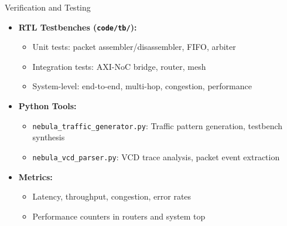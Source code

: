 \documentclass{beamer}
\begin{document}
\begin{frame}{Verification and Testing}
  \begin{itemize}
    \item \textbf{RTL Testbenches (\texttt{code/tb/}):}
      \begin{itemize}
        \item Unit tests: packet assembler/disassembler, FIFO, arbiter
        \item Integration tests: AXI-NoC bridge, router, mesh
        \item System-level: end-to-end, multi-hop, congestion, performance
      \end{itemize}
    \item \textbf{Python Tools:}
      \begin{itemize}
        \item \texttt{nebula\_traffic\_generator.py}: Traffic pattern generation, testbench synthesis
        \item \texttt{nebula\_vcd\_parser.py}: VCD trace analysis, packet event extraction
      \end{itemize}
    \item \textbf{Metrics:}
      \begin{itemize}
        \item Latency, throughput, congestion, error rates
        \item Performance counters in routers and system top
      \end{itemize}
  \end{itemize}
\end{frame}
\end{document}
